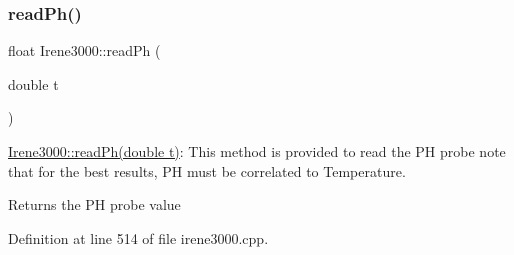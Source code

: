 \subsubsection{\texorpdfstring{read\+Ph()}{readPh()}}
{\footnotesize\ttfamily float Irene3000\+::read\+Ph (\begin{DoxyParamCaption}\item[{double}]{t }\end{DoxyParamCaption})}

\hyperlink{class_irene3000_a436fc0a06681cd0784aba56b9707f19a}{Irene3000\+::read\+Ph(double t)}\+: This method is provided to read the PH probe note that for the best results, PH must be correlated to Temperature.

\begin{DoxyReturn}{Returns}
the PH probe value 
\end{DoxyReturn}


Definition at line 514 of file irene3000.\+cpp.


